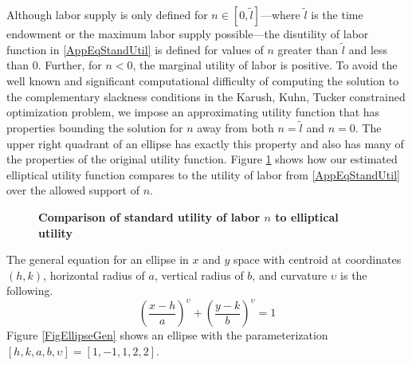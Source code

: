 \documentclass[letterpaper,12pt]{article}
\theoremstyle{definition}
\begin{document}
  Although labor supply is only defined for $n\in[0,\tilde{l}]$---where $\tilde{l}$ is the time endowment or the maximum labor supply possible---the disutility of labor function in \eqref{AppEqStandUtil} is defined for values of $n$ greater than $\tilde{l}$ and less than 0. Further, for $n<0$, the marginal utility of labor is positive. To avoid the well known and significant computational difficulty of computing the solution to the complementary slackness conditions in the Karush, Kuhn, Tucker constrained optimization problem, we impose an approximating utility function that has properties bounding the solution for $n$ away from both $n=\tilde{l}$ and $n=0$. The upper right quadrant of an ellipse has exactly this property and also has many of the properties of the original utility function. Figure \ref{FigUtilCompar} shows how our estimated elliptical utility function compares to the utility of labor from \eqref{AppEqStandUtil} over the allowed support of $n$.

  \begin{figure}[htb]\centering \captionsetup{width=4.0in}
    \caption{\label{FigUtilCompar}\textbf{Comparison of standard utility of labor $n$ to elliptical utility}}
  \end{figure}

  The general equation for an ellipse in $x$ and $y$ space with centroid at coordinates $(h,k)$, horizontal radius of $a$, vertical radius of $b$, and curvature $\upsilon$ is the following.
  \begin{equation}\label{AppEqEllipseGen}
    \left(\frac{x - h}{a}\right)^\upsilon + \left(\frac{y - k}{b}\right)^\upsilon = 1
  \end{equation}
  Figure \ref{FigEllipseGen} shows an ellipse with the parameterization $[h,k,a,b,\upsilon]=[1,-1,1,2,2]$.
\end{document}
